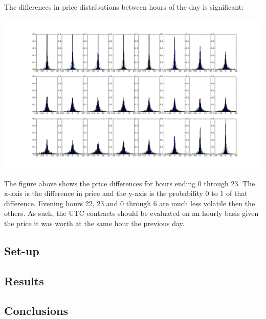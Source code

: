 \documentclass{report}
\begin{document}
The differences in price distributions between hours of the day is significant:
\begin{center}
\includegraphics[width=500pt, keepaspectratio=true]{hourly_distributions.jpg}\\
\end{center}
The figure above shows the price differences for hours ending 0 through 23. The x-axis
is the difference in price and the y-axis is the probability 0 to 1 of that difference.
Evening hours 22, 23 and 0 through 6 are much less volatile then the others. As such,
the UTC contracts should be evaluated on an hourly basis given the price it was
worth at the same hour the previous day.

\subsection*{Set-up}
\subsection*{Results}
\subsection*{Conclusions}

\nocite{*}


\end{document}
